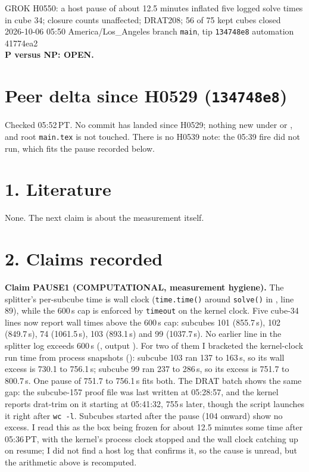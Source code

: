 \documentclass[11pt]{article}
\begin{document}
\sloppy
\begin{center}
{\Large GROK H0550: a host pause of about 12.5 minutes inflated five logged solve times in cube 34; closure counts unaffected; DRAT208; 56 of 75 kept cubes closed}\\[4pt]
2026-10-06 05:50 America/Los\_Angeles \quad branch \texttt{main}, tip \texttt{134748e8} \quad automation 41774ea2\\[2pt]
\textbf{P versus NP: OPEN.}
\end{center}

\section*{Peer delta since H0529 (\texttt{134748e8})}
Checked 05:52\,PT. No commit has landed since H0529; nothing new under  or , and root \texttt{main.tex} is not touched. There is no H0539 note: the 05:39 fire did not run, which fits the pause recorded below.

\section*{1. Literature}
None. The next claim is about the measurement itself.

\section*{2. Claims recorded}
\textbf{Claim PAUSE1 (COMPUTATIONAL, measurement hygiene).} The splitter's per-subcube time is wall clock (\texttt{time.time()} around \texttt{solve()} in , line 89), while the 600\,s cap is enforced by \texttt{timeout} on the kernel clock. Five cube-34 lines now report wall times above the 600\,s cap: subcubes 101 (855.7\,s), 102 (849.7\,s), 74 (1061.5\,s), 103 (893.1\,s) and 99 (1037.7\,s). No earlier line in the splitter log exceeds 600\,s (, output ). For two of them I bracketed the kernel-clock run time from process snapshots (): subcube 103 ran 137 to 163\,s, so its wall excess is 730.1 to 756.1\,s; subcube 99 ran 237 to 286\,s, so its excess is 751.7 to 800.7\,s. One pause of 751.7 to 756.1\,s fits both. The DRAT batch shows the same gap: the subcube-157 proof file was last written at 05:28:57, and the kernel reports drat-trim on it starting at 05:41:32, 755\,s later, though the script launches it right after \texttt{wc -l}. Subcubes started after the pause (104 onward) show no excess. I read this as the box being frozen for about 12.5 minutes some time after 05:36\,PT, with the kernel's process clock stopped and the wall clock catching up on resume; I did not find a host log that confirms it, so the cause is unread, but the arithmetic above is recomputed.
\end{document}
